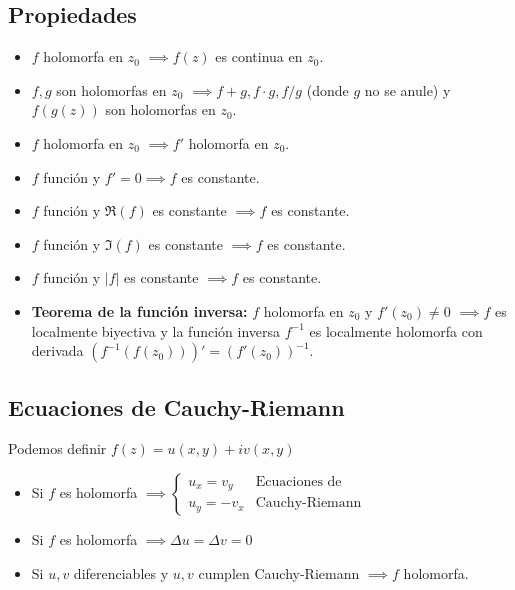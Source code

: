 \documentclass[paper=a4, fontsize=11pt]{scrartcl}
\numberwithin{equation}{section}
\numberwithin{figure}{section}
\numberwithin{table}{section}
\begin{document}
\subsection{Propiedades}
\begin{itemize}
\item $f$ holomorfa en $z_0$ $\implies f(z)$ es continua en $z_0$.
\item $f,g$ son holomorfas en $z_0$ $\implies f+g,f\cdot g, f/g$ (donde $g$ no se anule) y $f(g(z))$ son holomorfas en $z_0$.
\item $f$ holomorfa en $z_0$ $\implies f'$ holomorfa en $z_0$.
\item $f$ función y $f'=0\implies f$ es constante.
\item $f$ función y $\Re( f)$ es constante $\implies f$ es constante.
\item $f$ función y $\Im( f)$ es constante $\implies f$ es constante.
\item $f$ función y $|f|$ es constante $\implies f$ es constante.
\item \textbf{Teorema de la función inversa:} $f$ holomorfa en $z_0$ y $f'(z_0)\neq 0$ $\implies f$ es localmente biyectiva y la función inversa $f^{-1}$ es localmente holomorfa con derivada $(f^{-1}(f(z_0)))' = (f'(z_0))^{-1}$.
\end{itemize}

\subsection{Ecuaciones de Cauchy-Riemann}
Podemos definir $f(z) = u(x,y)+iv(x,y)$
\begin{itemize}
\item Si $f$ es holomorfa $\implies \boxed{
\left\{
\begin{array}{ll}
u_x=v_y&\text{Ecuaciones de}\\
u_y=-v_x&\text{Cauchy-Riemann}
\end{array}
\right.}$
\item Si $f$ es holomorfa $\implies \Delta u=\Delta v = 0$
\item Si $u, v$ diferenciables y $u,v$ cumplen Cauchy-Riemann $\implies f$ holomorfa.
\end{itemize}
\end{document}

